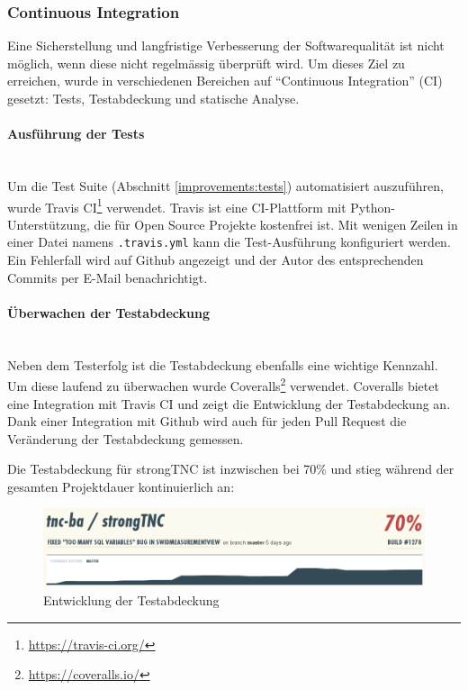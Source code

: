 \subsubsection{Continuous Integration}

Eine Sicherstellung und langfristige Verbesserung der Softwarequalität ist nicht
möglich, wenn diese nicht regelmässig überprüft wird. Um dieses Ziel zu
erreichen, wurde in verschiedenen Bereichen auf \enquote{Continuous
Integration} (CI) gesetzt: Tests, Testabdeckung und statische Analyse.

\paragraph{Ausführung der Tests} \hspace{0pt} \\
\label{improvements:travis}
Um die Test Suite (Abschnitt \ref{improvements:tests}) automatisiert
auszuführen, wurde Travis CI\footnote{\url{https://travis-ci.org/}}
verwendet. Travis ist eine CI-Plattform mit Python-Unterstützung, die für Open
Source Projekte kostenfrei ist. Mit wenigen Zeilen in einer
Datei namens \texttt{.travis.yml} kann die Test-Ausführung konfiguriert werden.
Ein Fehlerfall wird auf Github angezeigt und der Autor des
entsprechenden Commits per E-Mail benachrichtigt.

\paragraph{Überwachen der Testabdeckung} \hspace{0pt} \\
Neben dem Testerfolg ist die Testabdeckung ebenfalls eine wichtige Kennzahl. Um
diese laufend zu überwachen wurde
Coveralls\footnote{\url{https://coveralls.io/}} verwendet. Coveralls bietet eine
Integration mit Travis CI und zeigt die Entwicklung der Testabdeckung an. Dank
einer Integration mit Github wird auch für jeden Pull Request die Veränderung
der Testabdeckung gemessen.

Die Testabdeckung für strongTNC ist inzwischen bei 70\% und stieg während der
gesamten Projektdauer kontinuierlich an:

\begin{figure}[H]
	\centering
	\includegraphics[width=\textwidth]{images/coveralls}
	\caption{Entwicklung der Testabdeckung}
	\label{improvements:coveralls}
\end{figure}

